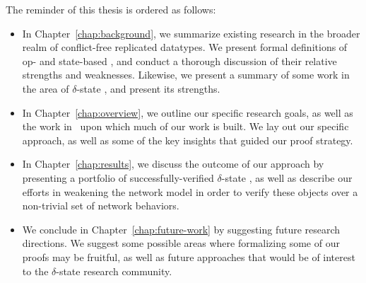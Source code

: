 The reminder of this thesis is ordered as follows:
\begin{itemize}
  \item In Chapter~\ref{chap:background}, we summarize existing research in the
    broader realm of conflict-free replicated datatypes. We present formal
    definitions of op- and state-based \CRDTs, and conduct a thorough discussion
    of their relative strengths and weaknesses. Likewise, we present a summary
    of some work in the area of $\delta$-state \CRDTs, and present its strengths.
  \item In Chapter~\ref{chap:overview}, we outline our specific research goals,
    as well as the work in~\citep{almedia18} upon which much of our work is
    built. We lay out our specific approach, as well as some of the key insights
    that guided our proof strategy.
  \item In Chapter~\ref{chap:results}, we discuss the outcome of our approach by
    presenting a portfolio of successfully-verified $\delta$-state \CRDTs, as
    well as describe our efforts in weakening the network model in order to
    verify these objects over a non-trivial set of network behaviors.
  \item We conclude in Chapter~\ref{chap:future-work} by suggesting future
    research directions. We suggest some possible areas where formalizing some
    of our proofs may be fruitful, as well as future approaches that would be of
    interest to the $\delta$-state \CRDT research community.
\end{itemize}

